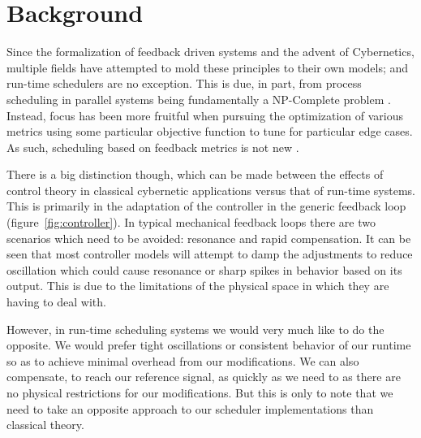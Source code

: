 \section{Background} %

Since the formalization of feedback driven systems and the advent of Cybernetics, multiple fields have attempted 
to mold these principles to their own models; and run-time schedulers are no exception. This is due, in part, from
process scheduling in parallel systems being fundamentally a NP-Complete problem \cite{bruno1976computer}. Instead,
focus has been more fruitful when pursuing the optimization of various metrics using some particular objective 
function \cite{garey1978performance} to tune for particular edge cases. As such, scheduling based on feedback 
metrics is not new \cite{dietz1997use}.

There is a big distinction though, which can be made between the effects of control theory in classical cybernetic applications 
versus that of run-time systems. This is primarily in the adaptation of the controller in the generic feedback 
loop (figure~\ref{fig:controller}).
In typical mechanical feedback loops there are two scenarios which need to be avoided: resonance 
and rapid compensation. It can be seen that most controller models will attempt to damp the adjustments to reduce 
oscillation which could cause resonance or sharp spikes in behavior based on its output. This is due to the  
limitations of the physical space in which they are having to deal with. 

However, in run-time scheduling systems we would very much like to do the opposite. We would prefer tight oscillations or 
consistent behavior of our runtime so as to achieve minimal overhead from our modifications. We can also compensate, 
to reach our reference signal, as quickly as we need to as there are no physical restrictions for our modifications. 
But this is only to note that we need to take an opposite approach to our scheduler implementations than classical 
theory.

